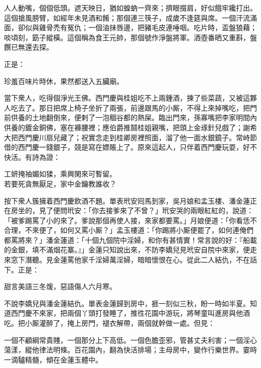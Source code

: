 \begin{myquote}
人人動嘴，個個低頭。遮天映日，猶如蝗蚋一齊來；擠眼掇肩，好似餓牢纔打出。這個搶風膀臂，如經年未見酒和餚；那個連三筷子，成歲不逢筵與席。一個汗流滿面，卻似與雞骨禿有冤仇；一個油抹唇邊，把豬毛皮連唾咽。吃片時，盃盤狼藉；啖頃刻，筯子縱橫。這個稱為食王元帥，那個號作淨盤將軍。酒壺番晒又重斟，盤饌已無還去探。
\end{myquote}

正是：

\begin{myquote}
珍羞百味片時休，果然都送入五臟廟。{}
\end{myquote}

當下衆人，吃得個淨光王佛。西門慶與桂姐吃不上兩鍾酒，揀了些菜蔬，又被這夥人吃去了。那日把席上椅子坐折了兩張，前邊跟馬的小厮，不得上來掉嘴吃，把門前供養的土地翻倒來，便剌了一泡稒谷都的熱屎。{}臨出門來，孫寡嘴把李家明間內供養的鍍金銅佛，塞在褲腰裡；應伯爵推鬪桂姐親嘴，把頭上金琢針兒戲了；謝希大把西門慶川扇兒藏了；祝實念走到桂卿房裡照面，溜了他一面水銀鏡子。常峙節借的西門慶一錢銀子，競是寫在嫖賬上了。原來這起人，只伴着西門慶玩耍，好不快活。有詩為證：

\begin{myquote}
工妍掩袖媚如猱，乘興閑來可暫留。\\若要死貪無厭足，家中金鑰教誰收？
\end{myquote}

按下衆人簇擁着西門慶飲酒不題。單表玳安囘馬到家，吳月娘和孟玉樓、潘金蓮正在房坐的，見了便問玳安：「你去接爹來了不曾？」玳安哭的兩眼紅紅的，說道：「被爹踢罵了小的來了。爹說那個再使人接，來家都要罵。」月娘便道：「你看恁不合理，不來便了，如何又罵小厮？」孟玉樓道：「你踢將小厮便罷了，如何連俺們都罵將來？」潘金蓮道：「十個九個院中淫婦，和你有甚情實！常言說的好：『船載的金銀，填不滿烟花寨。』」金蓮只知說出來，不防李嬌兒見玳安自院中來家，便走來窓下潛聽。見金蓮罵他家千淫婦萬淫婦，暗暗懷恨在心。從此二人結仇，不在話下。正是：

\begin{myquote}
甜言美語三冬煖，惡語傷人六月寒。
\end{myquote}

不說李嬌兒與潘金蓮結仇。單表金蓮歸到房中，捱一刻似三秋，盼一時如半夏。知道西門慶不來家，把兩個丫頭打發睡了，推徃花園中游玩，將琴童叫進房與他酒吃。把小厮灌醉了，{}掩上房門，褪衣解帶，兩個就幹做一處。但見：

\begin{myquote}
一個不顧綱常貴賤，一個那分上下高低。一個色膽歪邪，管甚丈夫利害；一個淫心蕩漾，縱他律法明條。百花園內，翻為快活排場；主母房中，變作行樂世界。霎時一滴驢精髓，{}傾在金蓮玉體中。
\end{myquote}

